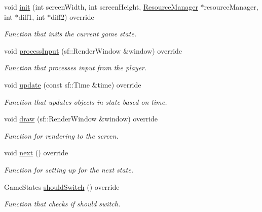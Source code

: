 \begin{DoxyCompactItemize}
\item 
void \hyperlink{classMenu__State_a63140e8ab87009a23c98f8cc6c5a0e0d}{init} (int screen\+Width, int screen\+Height, \hyperlink{classResourceManager}{Resource\+Manager} $\ast$resource\+Manager, int $\ast$diff1, int $\ast$diff2) override
\begin{DoxyCompactList}\small\item\em Function that inits the current game state. \end{DoxyCompactList}\item 
void \hyperlink{classMenu__State_aa89081baa3385d37ce7e7d32ca6936b1}{process\+Input} (sf\+::\+Render\+Window \&window) override
\begin{DoxyCompactList}\small\item\em Function that processes input from the player. \end{DoxyCompactList}\item 
void \hyperlink{classMenu__State_a353b8ecf678310fc1148e42d1024f76c}{update} (const sf\+::\+Time \&time) override
\begin{DoxyCompactList}\small\item\em Function that updates objects in state based on time. \end{DoxyCompactList}\item 
void \hyperlink{classMenu__State_a46ad8da266c214fcf086adde3092d263}{draw} (sf\+::\+Render\+Window \&window) override
\begin{DoxyCompactList}\small\item\em Function for rendering to the screen. \end{DoxyCompactList}\item 
void \hyperlink{classMenu__State_a11b2faeb1648c0003b43ab5b4b28bdae}{next} () override\hypertarget{classMenu__State_a11b2faeb1648c0003b43ab5b4b28bdae}{}\label{classMenu__State_a11b2faeb1648c0003b43ab5b4b28bdae}

\begin{DoxyCompactList}\small\item\em Function for setting up for the next state. \end{DoxyCompactList}\item 
Game\+States \hyperlink{classMenu__State_a6cfda60a96ab9bdf9c03a1cb66fc8ef2}{should\+Switch} () override
\begin{DoxyCompactList}\small\item\em Function that checks if should switch. \end{DoxyCompactList}\end{DoxyCompactItemize}
